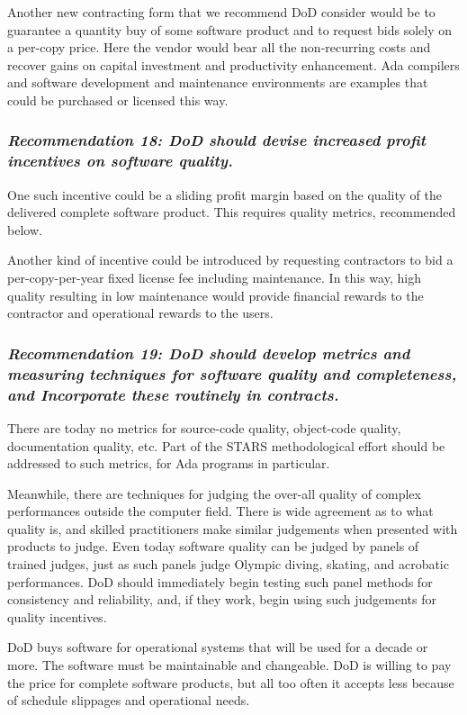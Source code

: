 \documentclass[12pt,final]{article}
\begin{document}
Another new contracting form that we recommend DoD consider would be to
guarantee a quantity buy of some software product and to request bids solely on
a per-copy price. Here the vendor would bear all the non-recurring costs and
recover gains on capital investment and productivity enhancement. Ada compilers
and software development and maintenance environments are examples that could
be purchased or licensed this way.

\subsubsection*{\textit{Recommendation 18: DoD should devise increased profit incentives on
software quality.}}

One such incentive could be a sliding profit margin based on the quality of the
delivered complete software product. This requires quality metrics, recommended
below.

Another kind of incentive could be introduced by requesting contractors to bid
a per-copy-per-year fixed license fee including maintenance. In this way, high
quality resulting in low maintenance would provide financial rewards to the
contractor and operational rewards to the users.

\subsubsection*{\textit{Recommendation 19: DoD should develop metrics and
measuring techniques for software quality and completeness, and Incorporate
these routinely in contracts.}}

There are today no metrics for source-code quality, object-code quality,
documentation quality, etc. Part of the STARS methodological effort should be
addressed to such metrics, for Ada programs in particular.

Meanwhile, there are techniques for judging the over-all quality of complex
performances outside the computer field. There is wide agreement as to what
quality is, and skilled practitioners make similar judgements when presented
with products to judge. Even today software quality can be judged by panels of
trained judges, just as such panels judge Olympic diving, skating, and
acrobatic performances. DoD should immediately begin testing such panel methods
for consistency and reliability, and, if they work, begin using such judgements
for quality incentives.

DoD buys software for operational systems that will be used for a decade or
more. The software must be maintainable and changeable. DoD is willing to pay
the price for complete software products, but all too often it accepts less
because of schedule slippages and operational needs.
\end{document}
